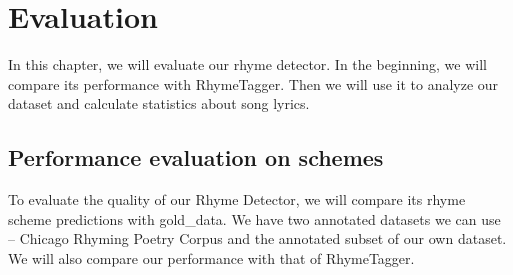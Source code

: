 \chapter{Evaluation}\label{evaluation}
In this chapter, we will evaluate our rhyme detector. In the beginning, we will compare its performance with RhymeTagger. Then we will use it to analyze our dataset and calculate statistics about song lyrics.

\section{Performance evaluation on schemes}
To evaluate the quality of our Rhyme Detector, we will compare its rhyme scheme predictions with \gls{gold_data}. We have two annotated datasets we can use -- Chicago Rhyming Poetry Corpus and  the annotated subset of our own dataset.
We will also compare our performance with that of RhymeTagger.

